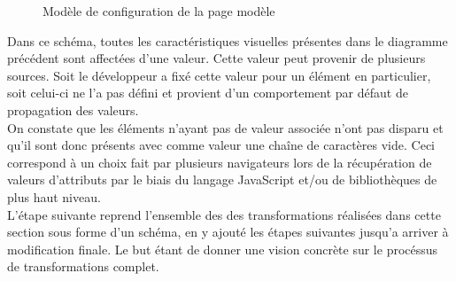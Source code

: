 \documentclass[french,a4paper]{report}
\begin{document}
{\begin{figure}[H]
\caption{Modèle de configuration de la page modèle}
\end{figure}
Dans ce schéma, toutes les caractéristiques visuelles présentes dans le
diagramme précédent sont affectées d'une valeur. Cette valeur peut
provenir de plusieurs sources. Soit le développeur a fixé cette valeur
pour un élément en particulier, soit celui-ci ne l'a pas défini et
provient d'un comportement par défaut de propagation des valeurs.
\\
On constate que les éléments n'ayant pas de valeur associée n'ont pas
disparu et qu'il sont donc présents avec comme valeur une chaîne de
caractères vide. Ceci correspond à un choix fait par plusieurs
navigateurs lors de la récupération de valeurs d'attributs par le
biais du langage JavaScript et/ou de bibliothèques de plus haut
niveau.\\
L'étape suivante reprend l'ensemble des des transformations réalisées
dans cette section sous forme d'un schéma, en y ajouté les étapes suivantes
jusqu'a arriver à modification finale. Le but étant de donner une vision
concrète sur le procéssus de transformations complet.
}
\end{document}
